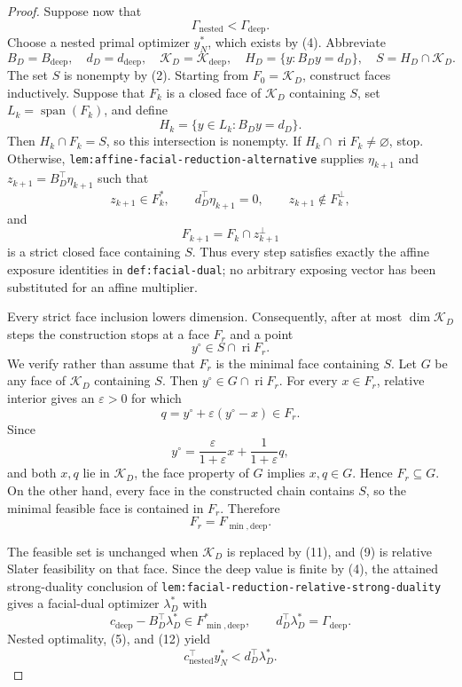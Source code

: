 \documentclass{article}
\begin{document}
\begin{proof}
Suppose now that
\[
 \Gamma_{\mathrm{nested}}<\Gamma_{\mathrm{deep}}.                     \tag{5}
\]
Choose a nested primal optimizer \(y_N^*\), which exists by (4).  Abbreviate
\[
 B_D=B_{\mathrm{deep}},\quad d_D=d_{\mathrm{deep}},\quad
 \mathcal K_D=\mathcal K_{\mathrm{deep}},\quad
 H_D=\{y:B_Dy=d_D\},\quad S=H_D\cap\mathcal K_D.
\]
The set \(S\) is nonempty by (2).  Starting from \(F_0=\mathcal K_D\), construct faces inductively.  Suppose that \(F_k\) is a closed face of \(\mathcal K_D\) containing \(S\), set \(L_k=\operatorname{span}(F_k)\), and define
\[
 H_k=\{y\in L_k:B_Dy=d_D\}.                                            \tag{6}
\]
Then \(H_k\cap F_k=S\), so this intersection is nonempty.  If \(H_k\cap\operatorname{ri}F_k\ne\varnothing\), stop.  Otherwise, \texttt{lem:affine-facial-reduction-alternative} supplies \(\eta_{k+1}\) and \(z_{k+1}=B_D^{\top}\eta_{k+1}\) such that
\[
 z_{k+1}\in F_k^*,\qquad
 d_D^{\top}\eta_{k+1}=0,\qquad
 z_{k+1}\notin F_k^\perp,                                              \tag{7}
\]
and
\[
 F_{k+1}=F_k\cap z_{k+1}^\perp                                         \tag{8}
\]
is a strict closed face containing \(S\).  Thus every step satisfies exactly the affine exposure identities in \texttt{def:facial-dual}; no arbitrary exposing vector has been substituted for an affine multiplier.

Every strict face inclusion lowers dimension.  Consequently, after at most \(\dim\mathcal K_D\) steps the construction stops at a face \(F_r\) and a point
\[
 y^\circ\in S\cap\operatorname{ri}F_r.                                \tag{9}
\]
We verify rather than assume that \(F_r\) is the minimal face containing \(S\).  Let \(G\) be any face of \(\mathcal K_D\) containing \(S\).  Then \(y^\circ\in G\cap\operatorname{ri}F_r\).  For every \(x\in F_r\), relative interior gives an \(\varepsilon>0\) for which
\[
 q=y^\circ+\varepsilon(y^\circ-x)\in F_r.
\]
Since
\[
 y^\circ=\frac{\varepsilon}{1+\varepsilon}x
          +\frac{1}{1+\varepsilon}q,                                   \tag{10}
\]
and both \(x,q\) lie in \(\mathcal K_D\), the face property of \(G\) implies \(x,q\in G\).  Hence \(F_r\subseteq G\).  On the other hand, every face in the constructed chain contains \(S\), so the minimal feasible face is contained in \(F_r\).  Therefore
\[
 F_r=F_{\min,\mathrm{deep}}.                                           \tag{11}
\]

The feasible set is unchanged when \(\mathcal K_D\) is replaced by (11), and (9) is relative Slater feasibility on that face.  Since the deep value is finite by (4), the attained strong-duality conclusion of \texttt{lem:facial-reduction-relative-strong-duality} gives a facial-dual optimizer \(\lambda_D^*\) with
\[
 c_{\mathrm{deep}}-B_D^{\top}\lambda_D^*
       \in F_{\min,\mathrm{deep}}^*,
 \qquad
 d_D^{\top}\lambda_D^*=\Gamma_{\mathrm{deep}}.                       \tag{12}
\]
Nested optimality, (5), and (12) yield
\[
 c_{\mathrm{nested}}^{\top}y_N^*
 <d_D^{\top}\lambda_D^*.                                               \tag{13}
\]


\end{proof}
\end{document}
